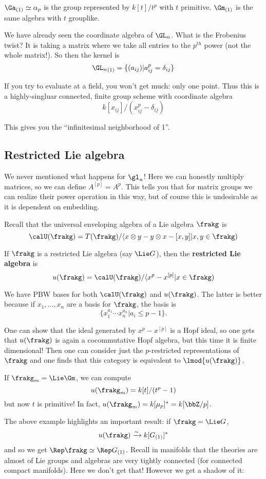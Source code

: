 \documentclass[12pt]{article}
\begin{document}
\begin{ex}
	${\Ga}_{(1)}\simeq \alpha_p$ is the group represented by $k[t]/t^p$ with $t$ primitive. ${\Gm}_{(1)}$
	is the same algebra with $t$ grouplike.
\end{ex}
\begin{ex}
	We have already seen the coordinate algebra of $\GL_n$. What is the Frobenius twist? It is taking a matrix 
	where we take all entries to the $p^{th}$ power (not the whole matrix!). So then the kernel is 
	\[{\GL_n}_{(1)}=\{(a_{ij})|a_{ij}^p=\delta_{ij}\}\]

	If you try to evaluate at a field, you won't get much: only one point. Thus this is a highly-singluar connected, finite 
	group scheme with coordinate algebra 
	\[k[x_{ij}]/(x_{ij}^p-\delta_{ij})\]

	This gives you the ``infinitesimal neighborhood of 1''.
\end{ex}

\subsection{Restricted Lie algebra}
\begin{rmk}
	We never mentioned what happens for $\gl_n$! Here we can honestly multiply matrices, so we can define $A^{[p]}=A^p$. This tells you that for 
	matrix groups we can realize their power operation in this way, but of course this is undesirable as it is dependent on embedding.
\end{rmk}

Recall that the universal enveloping algebra of a Lie algebra $\frakg$ is 
\[\calU(\frakg)=T(\frakg)/\langle x\otimes y-y\otimes x-[x,y]| x,y\in\frakg)\]
\begin{defn}
	If $\frakg$ is a restricted Lie algebra (say $\Lie G$), then the \textbf{restricted Lie algebra} is 
	\[u(\frakg)=\calU(\frakg)/\langle x^p-x^{[p]}|x\in\frakg)\]
\end{defn}
We have PBW bases for both $\calU(\frakg)$ and $u(\frakg)$. The latter is better because if $x_1,\dots,x_n$ are a basis for $\frakg$,
the basis is 
\[\{x_1^{a_1}\cdots x_n^{a_n}|a_i\le p-1\}.\]

One can show that the ideal generated by $x^p-x^{[p]}$ is a Hopf ideal, so one gets that $u(\frakg)$ is again a cocommutative Hopf algebra, 
but this time it is finite dimensional! Then one can consider just the $p$-restricted representations of $\frakg$ and one 
finds that this category is equivalent to $\lmod {u(\frakg)}$.
\begin{ex}
	If $\frakg_m=\Lie\Gm$, we can compute 
	\[u(\frakg_m)=k[t]/(t^p-1)\]
	but now $t$ is primitive! In fact, $u(\frakg_m)=k[\mu_p]^\ast=k[\bbZ/p]$.
\end{ex}
The above example highlights an important result: if $\frakg=\Lie G$,
\[u(\frakg)\xrightarrow{\sim}k[G_{(1)}]^\ast\]
and so we get $\Rep\frakg\simeq \Rep G_{(1)}$. Recall in manifolds that the theories are almost of Lie groups and algebras 
are very tightly connected (for connected compact manifolds). Here we don't get that! However we get a shadow of it:
\end{document}
